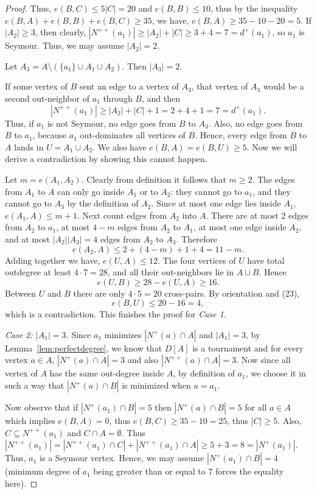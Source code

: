\documentclass[a4paper,fleqn]{cas-sc}
\theoremstyle{definition}
\begin{document}
\begin{proof}
Thus, $e(B,C)\le 5|C|=20$ and $e(B,B)\le 10$, thus by the inequality $e(B,A)+e(B,B)+e(B,C)\ge 35$, we have, $e(B,A)\ge 35-10-20=5.$
If $|A_2|\ge 3$, then clearly, $|N^{++}(a_1)|\ge |A_2|+|C|\ge 3+4=7=d^+(a_1)$,
so $a_1$ is Seymour. Thus, we may assume $|A_2|=2.$

Let $A_3=A\setminus (\{a_1\}\cup A_1\cup A_2).$ Then $|A_3|=2$. 

If some vertex of $B$ sent an edge to a vertex of $A_3$, that vertex of $A_3$ would be a second out-neighbor of $a_1$ through $B$, and then
\[
|N^{++}(a_1)|\ge |A_2|+|C|+1=2+4+1=7=d^+(a_1).
\]
Thus, if $a_1$ is not Seymour, no edge goes from $B$ to $A_3$. Also, no edge goes from $B$ to $a_1$, because $a_1$ out-dominates all vertices of $B$. Hence, every edge from $B$ to $A$ lands in $U=A_1\cup A_2.$ We also have $e(B,A)= e(B,U)\ge 5$. Now we will derive a contradiction by showing this cannot happen.


Let $m=e(A_1,A_2)$. Clearly from definition it follows that $m\geq 2$. The edges from $A_1$ to $A$ can only go inside $A_1$ or to $A_2$: they cannot go to $a_1$, and they cannot go to $A_3$ by the definition of $A_2$. Since at most one edge lies inside $A_1$, $e(A_1,A)\le m+1$.
Next count edges from $A_2$ into $A$. There are at most $2$ edges from $A_2$ to $a_1$, at most $4-m$ edges from $A_2$ to $A_1$, at most one edge inside $A_2$, and at most $|A_2||A_3|=4$ edges from $A_2$ to $A_3$. Therefore
\[
 e(A_2,A)\le 2+(4-m)+1+4=11-m.
\]
Adding together we have, $e(U,A)\le 12$.
The four vertices of $U$ have total outdegree at least $4\cdot 7=28$, and all their out-neighbors lie in $A\cup B$. Hence
\[
 e(U,B)\ge 28-e(U,A)\ge 16.
\]
Between $U$ and $B$ there are only $4\cdot 5=20$ cross-pairs. By orientation and (23),
\[
 e(B,U)\le 20-16=4,
\]
which is a contradiction. This finishes the proof for \emph{Case 1}.

\medskip
\noindent\emph{Case 2: $|A_1|=3$.}
Since $a_1$ minimizes $|N^+(a)\cap A|$ and $|A_1|=3$, by Lemma~\ref{lem:perfectdegree}, we know that $D[A]$ is a tournament and for every vertex $a\in A$, $|N^+(a) \cap A|=3$ and also $|N^{++}(a)\cap A|=3$. Now since all vertex of $A$ has the same out-degree inside $A$, by definition of $a_1$, we choose it in such a way that $|N^+(a)\cap B|$ is minimized when $a=a_1$.

Now observe that if $|N^+(a_1)\cap B|=5$ then $|N^+(a)\cap B|=5$ for all $a\in A$ which implies $e(B,A)=0$, thus $e(B,C)\geq 35-10=25$, thus $|C|\geq 5$. Also, $C\subseteq N^{++}(a_1)$ and $C\cap A=\emptyset$. Thus $|N^{++}(a_1)|=|N^{++}(a_1)\cap C| + |N^{++}(a_1)\cap A|\geq 5+3=8=|N^+(a_1)|$. Thus, $a_1$ is a Seymour vertex. Hence, we may assume $|N^{+}(a_1)\cap B|=4$ (minimum degree of $a_1$ being greater than or equal to $7$ forces the equality here).


\end{proof}
\end{document}

